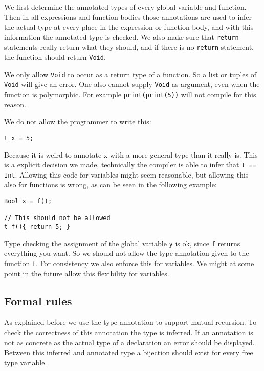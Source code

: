 \documentclass[14pt]{amsart}
\begin{document}
We first determine the annotated types of every global variable and function. Then in all expressions and function bodies those annotations are used to infer the actual type at every place in the expression or function body, and with this information the annotated type is checked. We also make sure that \texttt{return} statements really return what they should, and if there is no \texttt{return} statement, the function should return \texttt{Void}.

We only allow \texttt{Void} to occur as a return type of a function. So a list or tuples of \texttt{Void} will give an error. One also cannot supply \texttt{Void} as argument, even when the function is polymorphic. For example \texttt{print(print(5))} will not compile for this reason.

We do not allow the programmer to write this:

\begin{lstlisting}
t x = 5;
\end{lstlisting}

Because it is weird to annotate x with a more general type than it really is. This is a explicit decision we made, technically the compiler is able to infer that \texttt{t == Int}. Allowing this code for variables might seem reasonable, but allowing this also for functions is wrong, as can be seen in the following example:

\begin{lstlisting}
Bool x = f();

// This should not be allowed
t f(){ return 5; }
\end{lstlisting}

Type checking the assignment of the global variable \texttt{y} is ok, since \texttt{f} returns everything you want. So we should not allow the type annotation given to the function \texttt{f}. For consistency we also enforce this for variables. We might at some point in the future allow this flexibility for variables.

\subsection{Formal rules}

\newcommand{\T}{\mathcal{T}}
\newcommand{\U}{\mathcal{U}}
\newcommand{\s}{\ast}
\newcommand{\sn}[1]{\s_{#1}}

As explained before we use the type annotation to support mutual recursion. To check the correctness of this annotation the type is inferred. If an annotation is not as concrete as the actual type of a declaration an error should be displayed. Between this inferred and annotated type a bijection should exist for every free type variable.
\end{document}
